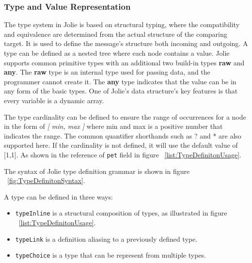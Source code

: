 \subsubsection{Type and Value Representation}
\label{sec:jolie-type-def}

The type system in Jolie is based on structural typing\cite{jolie-type-2019}, where the compatibility and equivalence are determined from the actual structure of the comparing target. It is used to define the message's structure both incoming and outgoing. A type can be defined as a nested tree where each node contains a value. Jolie supports common primitive types with an additional two build-in types \textbf{raw} and \textbf{any}. The \textbf{raw} type is an internal type used for passing data, and the programmer cannot create it. The \textbf{any} type indicates that the value can be in any form of the basic types. One of Jolie's data structure's key features is that every variable is a dynamic array.

The type cardinality can be defined to ensure the range of occurrences for a node in the form of \textit{[ min, max ]} where min and max is a positive number that indicates the range. The common quantifier shorthands such as ? and *  are also supported here. If the cardinality is not defined, it will use the default value of [1,1]. As shown in the reference of \texttt{pet} field in figure ~\ref{list:TypeDefinitonUsage}.

The syntax of Jolie type definition grammar is shown in figure ~\ref{fig:TypeDefinitonSyntax}.

A type can be defined in three ways:
\begin{itemize}
	\item \texttt{typeInline} is a structural composition of types, as illustrated in figure ~\ref{list:TypeDefinitonUsage}.
	\item \texttt{typeLink} is a definition aliasing to a previously defined type.
	\item \texttt{typeChoice} is a type that can be represent from multiple types.
\end{itemize}

